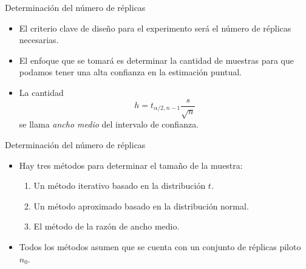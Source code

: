 \begin{frame}{Determinación del número de réplicas}
    \begin{itemize}
        \item El criterio clave de diseño para el experimento será el número de réplicas necesarias. %
        \item El enfoque que se tomará es determinar la cantidad de muestras para que podamos tener una alta confianza en la estimación puntual.
        \item La cantidad
        \[h=t_{\alpha/2,n-1}\frac{s}{\sqrt{n}}\]
        se llama \textit{ancho medio} del intervalo de confianza.
    \end{itemize}
\end{frame}    

    
\begin{frame}{Determinación del número de réplicas}
    \begin{itemize}
        \item Hay tres métodos para determinar el tamaño de la muestra:
        \begin{enumerate}
            \item Un método iterativo basado en la distribución $t$.
            \item Un método aproximado basado en la distribución normal.
            \item El método de la razón de ancho medio.
        \end{enumerate}
        \item Todos los métodos asumen que se cuenta con un conjunto de réplicas piloto $n_0$. %
    \end{itemize}
\end{frame}  

